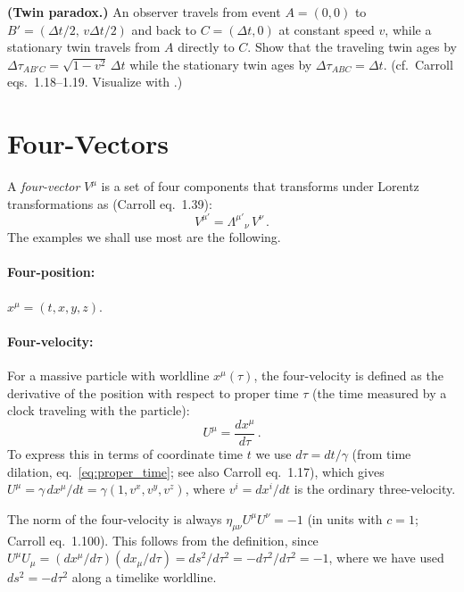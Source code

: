 \begin{exercise}
\label{ex:twin_paradox}
\textbf{(Twin paradox.)} An observer travels from event $A = (0, 0)$ to
$B' = (\Delta t/2,\, v\Delta t/2)$ and back to $C = (\Delta t, 0)$ at
constant speed $v$, while a stationary twin travels from $A$ directly to
$C$.  Show that the traveling twin ages by
$\Delta\tau_{AB'C} = \sqrt{1 - v^2}\,\Delta t$ while the stationary twin
ages by $\Delta\tau_{ABC} = \Delta t$.
(cf.\ Carroll eqs.~1.18--1.19.  Visualize with
.)
\end{exercise}


\section{Four-Vectors}
\label{sec:four_vectors}

A \emph{four-vector} $V^\mu$ is a set of four components that transforms
under Lorentz transformations as (Carroll eq.~1.39):
\begin{equation}
    V^{\mu'} = \Lambda^{\mu'}{}_\nu\, V^\nu \,.
    \label{eq:vector_transform}
\end{equation}
The examples we shall use most are the following.

\paragraph{Four-position:} $x^\mu = (t, x, y, z)$.

\paragraph{Four-velocity:} For a massive particle with worldline
$x^\mu(\tau)$, the four-velocity is defined as the derivative of the
position with respect to proper time $\tau$ (the time measured
by a clock traveling with the particle):
\begin{equation}
    U^\mu = \frac{dx^\mu}{d\tau} \,.
    \label{eq:four_velocity}
\end{equation}
To express this in terms of coordinate time $t$ we use
$d\tau = dt/\gamma$ (from time dilation, eq.~\eqref{eq:proper_time};
see also Carroll eq.~1.17), which gives
$U^\mu = \gamma\, dx^\mu/dt = \gamma(1, v^x, v^y, v^z)$,
where $v^i = dx^i/dt$ is the ordinary three-velocity.

The norm of the four-velocity is always
$\eta_{\mu\nu} U^\mu U^\nu = -1$ (in units with $c = 1$;
Carroll eq.~1.100).
This follows from the definition, since
$U^\mu U_\mu = (dx^\mu/d\tau)(dx_\mu/d\tau)
= ds^2/d\tau^2 = -d\tau^2/d\tau^2 = -1$,
where we have used $ds^2 = -d\tau^2$ along a timelike worldline.

